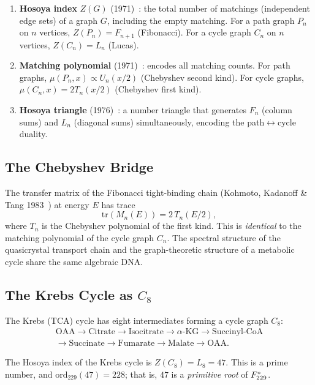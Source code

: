 \begin{enumerate}[noitemsep]
    \item \textbf{Hosoya index} $Z(G)$ (1971)~\cite{Hosoya71}: the total number of matchings (independent edge sets) of a graph $G$, including the empty matching. For a path graph $P_n$ on $n$ vertices, $Z(P_n) = F_{n+1}$ (Fibonacci). For a cycle graph $C_n$ on $n$ vertices, $Z(C_n) = L_n$ (Lucas).
    \item \textbf{Matching polynomial} (1971)~\cite{Hosoya71}: encodes all matching counts. For path graphs, $\mu(P_n, x) \propto U_n(x/2)$ (Chebyshev second kind). For cycle graphs, $\mu(C_n, x) = 2 T_n(x/2)$ (Chebyshev first kind).
    \item \textbf{Hosoya triangle} (1976)~\cite{Hosoya76}: a number triangle that generates $F_n$ (column sums) and $L_n$ (diagonal sums) simultaneously, encoding the path$\leftrightarrow$cycle duality.
\end{enumerate}

\subsection{The Chebyshev Bridge}

The transfer matrix of the Fibonacci tight-binding chain (Kohmoto, Kadanoff \& Tang 1983~\cite{KKT83}) at energy $E$ has trace
\begin{equation}\label{eq:transfer}
    \mathrm{tr}(M_n(E)) = 2\,T_n(E/2),
\end{equation}
where $T_n$ is the Chebyshev polynomial of the first kind. This is \emph{identical} to the matching polynomial of the cycle graph $C_n$. The spectral structure of the quasicrystal transport chain and the graph-theoretic structure of a metabolic cycle share the same algebraic DNA.

\subsection{The Krebs Cycle as $C_8$}

The Krebs (TCA) cycle has eight intermediates forming a cycle graph $C_8$:
\begin{gather*}
\text{OAA} \to \text{Citrate} \to \text{Isocitrate} \to \alpha\text{-KG} \to \text{Succinyl-CoA} \\
\to \text{Succinate} \to \text{Fumarate} \to \text{Malate} \to \text{OAA}.
\end{gather*}

\begin{result}\label{res:krebs_hosoya}
The Hosoya index of the Krebs cycle is $Z(C_8) = L_8 = 47$. This is a prime number, and $\mathrm{ord}_{229}(47) = 228$; that is, $47$ is a \emph{primitive root} of\/ $F_{229}^*$.
\end{result}

